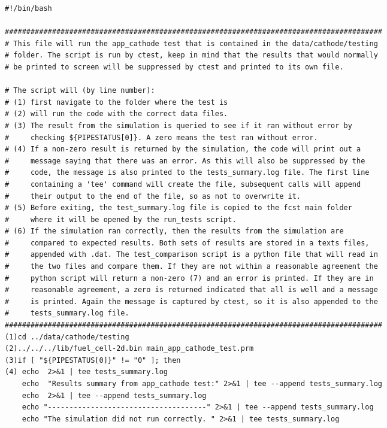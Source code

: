 \begin{changemargin}{-1.5cm}{-1cm} 
\begin{lstlisting}
#!/bin/bash

########################################################################################
# This file will run the app_cathode test that is contained in the data/cathode/testing 
# folder. The script is run by ctest, keep in mind that the results that would normally 
# be printed to screen will be suppressed by ctest and printed to its own file. 

# The script will (by line number): 
# (1) first navigate to the folder where the test is
# (2) will run the code with the correct data files. 
# (3) The result from the simulation is queried to see if it ran without error by 
#     checking ${PIPESTATUS[0]}. A zero means the test ran without error.
# (4) If a non-zero result is returned by the simulation, the code will print out a 
#     message saying that there was an error. As this will also be suppressed by the 
#     code, the message is also printed to the tests_summary.log file. The first line 
#     containing a 'tee' command will create the file, subsequent calls will append 
#     their output to the end of the file, so as not to overwrite it. 
# (5) Before exiting, the test_summary.log file is copied to the fcst main folder 
#     where it will be opened by the run_tests script.
# (6) If the simulation ran correctly, then the results from the simulation are 
#     compared to expected results. Both sets of results are stored in a texts files, 
#     appended with .dat. The test_comparison script is a python file that will read in 
#     the two files and compare them. If they are not within a reasonable agreement the 
#     python script will return a non-zero (7) and an error is printed. If they are in 
#     reasonable agreement, a zero is returned indicated that all is well and a message 
#     is printed. Again the message is captured by ctest, so it is also appended to the 
#     tests_summary.log file. 
########################################################################################
(1)cd ../data/cathode/testing
(2)../../../lib/fuel_cell-2d.bin main_app_cathode_test.prm
(3)if [ "${PIPESTATUS[0]}" != "0" ]; then
(4) echo  2>&1 | tee tests_summary.log
    echo  "Results summary from app_cathode test:" 2>&1 | tee --append tests_summary.log
    echo  2>&1 | tee --append tests_summary.log
    echo "-------------------------------------" 2>&1 | tee --append tests_summary.log
    echo "The simulation did not run correctly. " 2>&1 | tee tests_summary.log

\end{lstlisting}
\end{changemargin}
